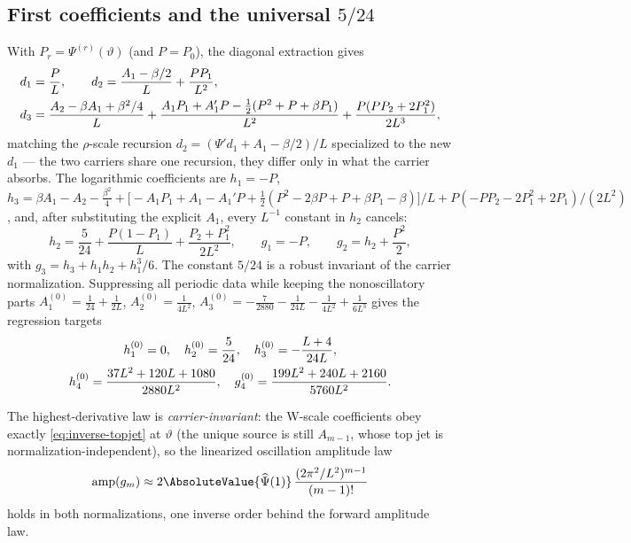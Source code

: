 \documentclass[11pt,oneside]{article}
\numberwithin{equation}{section}
\theoremstyle{definition}
\theoremstyle{remark}
\newcommand{\Psihat}{\widehat\Psi}
\begin{document}
\subsection{First coefficients and the universal $5/24$}

With $P_r=\Psi^{(r)}(\vartheta)$ (and $P=P_0$), the diagonal
extraction gives
\begin{align}
 d_1&=\frac PL,
 \qquad
 d_2=\frac{A_1-\beta/2}{L}+\frac{PP_1}{L^{2}},
 \notag\\
 d_3&=\frac{A_2-\beta A_1+\beta^{2}/4}{L}
 +\frac{A_1P_1+A_1'P-\tfrac12(P^{2}+P+\beta P_1)}{L^{2}}
 +\frac{P(PP_2+2P_1^{2})}{2L^{3}},
 \label{eq:W-d123}
\end{align}
matching the $\rho$-scale recursion
$d_2=(\Psi'd_1+A_1-\beta/2)/L$ specialized to the new
$d_1$ --- the two carriers share one recursion, they differ only in
what the carrier absorbs.  The logarithmic coefficients are
$h_1=-P$,
$h_3=\beta A_1-A_2-\tfrac{\beta^{2}}4
+\bigl[-A_1P_1+A_1-A_1'P
+\tfrac12(P^{2}-2\beta P+P+\beta P_1-\beta)\bigr]/L
+P(-PP_2-2P_1^{2}+2P_1)/(2L^{2})$, and, after substituting the
explicit $A_1$, every $L^{-1}$ constant in $h_2$ cancels:
\begin{equation}
 \boxed{\;
 h_2=\frac5{24}
 +\frac{P(1-P_1)}{L}
 +\frac{P_2+P_1^{2}}{2L^{2}},
 \qquad
 g_1=-P,
 \qquad
 g_2=h_2+\frac{P^{2}}2,
 \;}
 \label{eq:524}
\end{equation}
with $g_3=h_3+h_1h_2+h_1^{3}/6$.  The constant $5/24$ is a robust
invariant of the carrier normalization.  Suppressing all periodic
data while keeping the nonoscillatory parts
$A_1^{(0)}=\tfrac1{24}+\tfrac1{2L}$,
$A_2^{(0)}=\tfrac1{4L^{2}}$,
$A_3^{(0)}=-\tfrac7{2880}-\tfrac1{24L}-\tfrac1{4L^{2}}+\tfrac1{6L^{3}}$
gives the regression targets
\begin{gather}
 h_1^{(0)}=0,\quad
 h_2^{(0)}=\frac5{24},\quad
 h_3^{(0)}=-\frac{L+4}{24L},
 \notag\\
 h_4^{(0)}=\frac{37L^{2}+120L+1080}{2880L^{2}},\quad
 g_4^{(0)}=\frac{199L^{2}+240L+2160}{5760L^{2}}.
 \label{eq:zero-periodic}
\end{gather}

The highest-derivative law is \emph{carrier-invariant}: the W-scale
coefficients obey exactly
\eqref{eq:inverse-topjet} at $\vartheta$ (the unique source is still
$A_{m-1}$, whose top jet is normalization-independent), so the
linearized oscillation amplitude law
\begin{equation}
 \operatorname{amp}(g_m)\approx
 2\AbsoluteValue{\Psihat(1)}\,
 \frac{(2\pi^{2}/L^{2})^{m-1}}{(m-1)!}
 \label{eq:amplitude-law}
\end{equation}
holds in both normalizations, one inverse order behind the forward
amplitude law.
\end{document}
